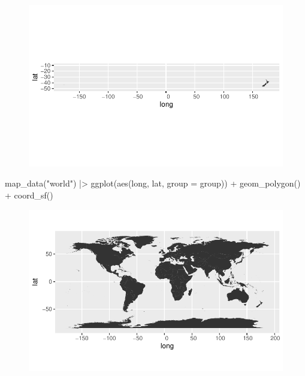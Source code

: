 \documentclass[
  letterpaper,
  DIV=11,
  numbers=noendperiod]{scrartcl}
\newenvironment{Shaded}{\begin{snugshade}}{\end{snugshade}}
\newcommand{\AttributeTok}[1]{\textcolor[rgb]{0.40,0.45,0.13}{#1}}
\newcommand{\FunctionTok}[1]{\textcolor[rgb]{0.28,0.35,0.67}{#1}}
\newcommand{\NormalTok}[1]{\textcolor[rgb]{0.00,0.23,0.31}{#1}}
\newcommand{\SpecialCharTok}[1]{\textcolor[rgb]{0.37,0.37,0.37}{#1}}
\newcommand{\StringTok}[1]{\textcolor[rgb]{0.13,0.47,0.30}{#1}}
\begin{document}
\begin{figure}[H]

{\centering \includegraphics{Introduction-to-mapping_files/figure-pdf/unnamed-chunk-2-1.pdf}

}

\end{figure}

\begin{Shaded}
\begin{Highlighting}[]
\FunctionTok{map\_data}\NormalTok{(}\StringTok{"world"}\NormalTok{) }\SpecialCharTok{|\textgreater{}} 
  \FunctionTok{ggplot}\NormalTok{(}\FunctionTok{aes}\NormalTok{(long, lat, }\AttributeTok{group =}\NormalTok{ group)) }\SpecialCharTok{+} 
  \FunctionTok{geom\_polygon}\NormalTok{() }\SpecialCharTok{+}
  \FunctionTok{coord\_sf}\NormalTok{()}
\end{Highlighting}
\end{Shaded}

\begin{figure}[H]

{\centering \includegraphics{Introduction-to-mapping_files/figure-pdf/unnamed-chunk-2-2.pdf}

}

\end{figure}
\end{document}
